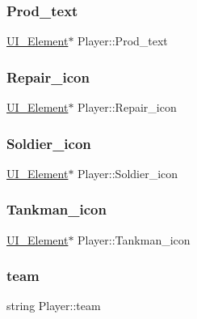 \subsubsection{\texorpdfstring{Prod\_text}{Prod\_text}}
{\footnotesize\ttfamily \mbox{\hyperlink{class_u_i___element}{U\+I\+\_\+\+Element}}$\ast$ Player\+::\+Prod\+\_\+text}

\mbox{\label{class_player_a413823bd408e445f96acd34a381638d7}} 
\subsubsection{\texorpdfstring{Repair\_icon}{Repair\_icon}}
{\footnotesize\ttfamily \mbox{\hyperlink{class_u_i___element}{U\+I\+\_\+\+Element}}$\ast$ Player\+::\+Repair\+\_\+icon}

\mbox{\label{class_player_abb51b9657cede554e090b1ca8aef5933}} 
\subsubsection{\texorpdfstring{Soldier\_icon}{Soldier\_icon}}
{\footnotesize\ttfamily \mbox{\hyperlink{class_u_i___element}{U\+I\+\_\+\+Element}}$\ast$ Player\+::\+Soldier\+\_\+icon}

\mbox{\label{class_player_aca20327e291a4a6d68bce39546585215}} 
\subsubsection{\texorpdfstring{Tankman\_icon}{Tankman\_icon}}
{\footnotesize\ttfamily \mbox{\hyperlink{class_u_i___element}{U\+I\+\_\+\+Element}}$\ast$ Player\+::\+Tankman\+\_\+icon}

\mbox{\label{class_player_a046a64a6e7ec2e6ebce2178bccf9deab}} 
\subsubsection{\texorpdfstring{team}{team}}
{\footnotesize\ttfamily string Player\+::team}

